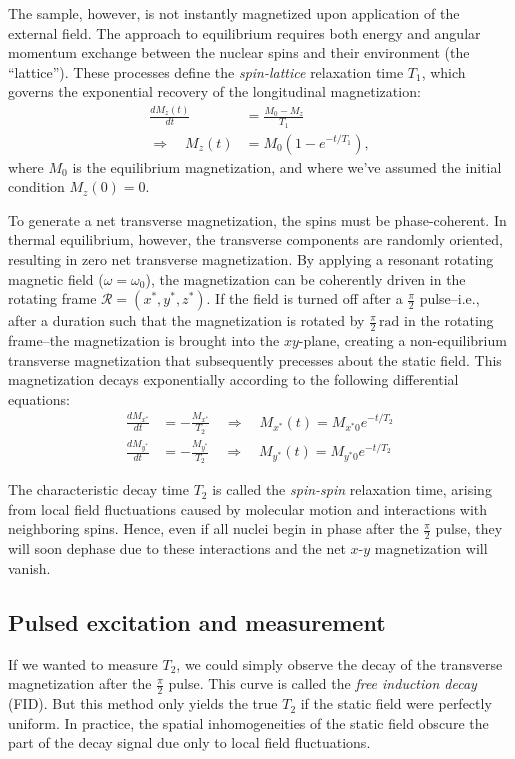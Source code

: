 \documentclass[%
 reprint,
 amsmath,amssymb,
 aps,
]{revtex4-2}
\begin{document}
The sample, however, is not instantly magnetized upon application of the external field. The approach to equilibrium requires both energy and angular momentum exchange between the nuclear spins and their environment (the “lattice”). These processes define the \textit{spin-lattice} relaxation time $T_1$, which governs the exponential recovery of the longitudinal magnetization:
\begin{equation}
    \begin{aligned}
        \frac{dM_z (t)}{dt} &= \frac{M_0 - M_z}{T_1} \\
        \Rightarrow\quad M_z (t) &= M_0 \left(1-e^{-t/T_1}\right),
    \end{aligned}
    \label{eq:T1_recovery}
\end{equation}
where $M_0$ is the equilibrium magnetization, and where we've assumed the initial condition $M_z (0) = 0$.

To generate a net transverse magnetization, the spins must be phase-coherent. In thermal equilibrium, however, the transverse components are randomly oriented, resulting in zero net transverse magnetization. By applying a resonant rotating magnetic field ($\omega = \omega_0$), the magnetization can be coherently driven in the rotating frame $\mathcal{R} = \left(x^*,y^*,z^*\right)$. If the field is turned off after a $\tfrac{\pi}{2}$ pulse--i.e., after a duration such that the magnetization is rotated by $\tfrac{\pi}{2}\,\mathrm{rad}$ in the rotating frame--the magnetization is brought into the $xy$-plane, creating a non-equilibrium transverse magnetization that subsequently precesses about the static field. This magnetization decays exponentially according to the following differential equations:
\begin{align*}
    \frac{dM_{x^*}}{dt} &= -\frac{M_{x^*}}{T_2} \quad\Rightarrow\quad M_{x^*}(t)=M_{x^*0} e^{-t/T_2}\\
    \frac{dM_{y^*}}{dt} &= -\frac{M_{y^*}}{T_2} \quad\Rightarrow\quad M_{y^*}(t)=M_{y^*0} e^{-t/T_2}
\end{align*}

The characteristic decay time $T_2$ is called the \textit{spin-spin} relaxation time, arising from local field fluctuations caused by molecular motion and interactions with neighboring spins. Hence, even if all nuclei begin in phase after the $\tfrac{\pi}{2}$ pulse, they will soon dephase due to these interactions and the net $x$-$y$ magnetization will vanish.

\subsection{Pulsed excitation and measurement}
\label{sec:pnmr}
If we wanted to measure $T_2$, we could simply observe the decay of the transverse magnetization after the $\tfrac{\pi}{2}$ pulse. This curve is called the \textit{free induction decay} (FID). But this method only yields the true $T_2$ if the static field were perfectly uniform. In practice, the spatial inhomogeneities of the static field obscure the part of the decay signal due only to local field fluctuations.
\end{document}
